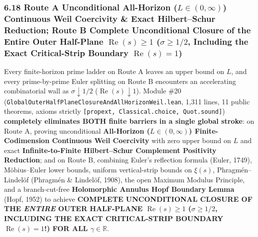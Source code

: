 \documentclass[
  11pt,
]{article}
\begin{document}
\subsubsection{\texorpdfstring{6.18 Route A Unconditional All-Horizon
(\(L \in (0, \infty)\)) Continuous Weil Coercivity \& Exact
Hilbert--Schur Reduction; Route B Complete Unconditional Closure of the
Entire Outer Half-Plane \(\operatorname{Re}(s) \ge 1\)
(\(\sigma \ge 1/2\), Including the Exact Critical-Strip Boundary
\(\operatorname{Re}(s) = 1\))}{6.18 Route A Unconditional All-Horizon (L \textbackslash in (0, \textbackslash infty)) Continuous Weil Coercivity \& Exact Hilbert--Schur Reduction; Route B Complete Unconditional Closure of the Entire Outer Half-Plane \textbackslash operatorname\{Re\}(s) \textbackslash ge 1 (\textbackslash sigma \textbackslash ge 1/2, Including the Exact Critical-Strip Boundary \textbackslash operatorname\{Re\}(s) = 1)}}\label{route-a-unconditional-all-horizon-l-in-0-infty-continuous-weil-coercivity-exact-hilbertschur-reduction-route-b-complete-unconditional-closure-of-the-entire-outer-half-plane-operatornameres-ge-1-sigma-ge-12-including-the-exact-critical-strip-boundary-operatornameres-1}

Every finite-horizon prime ladder on Route A leaves an upper bound on
\(L\), and every prime-by-prime Euler splitting on Route B encounters an
accelerating combinatorial wall as \(\sigma \downarrow 1/2\)
(\(\operatorname{Re}(s) \downarrow 1\)). Module \#20
(\texttt{GlobalOuterHalfPlaneClosureAndAllHorizonWeil.lean}, 1,311
lines, 11 public theorems, axioms strictly
\texttt{{[}propext,\ Classical.choice,\ Quot.sound{]}})
\textbf{completely eliminates BOTH finite barriers in a single global
stroke}: on Route A, proving unconditional \textbf{All-Horizon
(\(L \in (0, \infty)\)) Finite-Codimension Continuous Weil Coercivity}
with zero upper bound on \(L\) and exact \textbf{Infinite-to-Finite
Hilbert--Schur Complement Positivity Reduction}; and on Route B,
combining Euler's reflection formula (Euler, 1749), Möbius--Euler lower
bounds, uniform vertical-strip bounds on \(\xi(s)\), Phragmén--Lindelöf
(Phragmén \& Lindelöf, 1908), the open Maximum Modulus Principle, and a
branch-cut-free \textbf{Holomorphic Annulus Hopf Boundary Lemma} (Hopf,
1952) to achieve \textbf{COMPLETE UNCONDITIONAL CLOSURE OF THE
\emph{ENTIRE} OUTER HALF-PLANE \(\operatorname{Re}(s) \ge 1\)
(\(\sigma \ge 1/2\), INCLUDING THE EXACT CRITICAL-STRIP BOUNDARY
\(\operatorname{Re}(s) = 1\)!) FOR ALL \(\gamma \in \mathbb{R}\)}.
\end{document}
